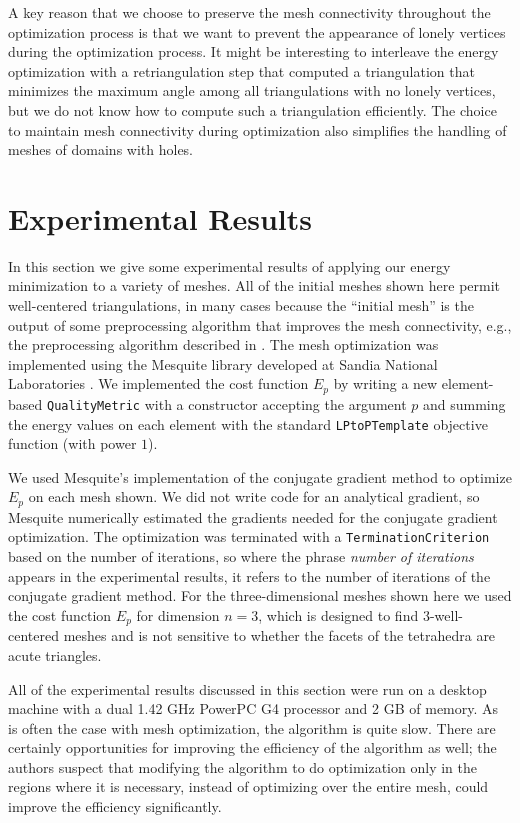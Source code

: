 \documentclass[final]{siamltex}
\begin{document}
A key reason that we choose to preserve the mesh connectivity
throughout the optimization process is that we want to
prevent the appearance of lonely vertices
during the optimization process.  It might
be interesting to interleave the energy optimization with a
retriangulation step that computed a triangulation that minimizes the
maximum angle among all triangulations with no lonely vertices, but we
do not know how to compute such a triangulation efficiently.  The
choice to maintain mesh connectivity during optimization also
simplifies the handling of meshes of domains with holes.



\section{Experimental Results}
\label{sec:results}

In this section we give some experimental results of applying our
energy minimization to a variety of meshes.  All of the initial meshes
shown here permit well-centered triangulations,
in many cases because the ``initial mesh'' is the output
of some preprocessing algorithm that improves the mesh
connectivity, e.g., the preprocessing algorithm described
in \cite{VaHiGuRa2007}.
The mesh optimization was
implemented using the Mesquite library developed at Sandia National
Laboratories \cite{BrDiKnLeMe2003}.  We implemented the cost function
$E_{p}$ by writing a new element-based {\texttt{QualityMetric}} with a
constructor accepting the argument $p$ and summing the energy values
on each element with the standard {\texttt{LPtoPTemplate}} objective
function (with power $1$).

We used Mesquite's implementation of the conjugate gradient method to
optimize $E_{p}$ on each mesh shown.  We did not write code for an
analytical gradient, so Mesquite numerically estimated the gradients
needed for the conjugate gradient optimization.  The optimization was
terminated with a {\texttt{TerminationCriterion}} based on the number
of iterations, so where the phrase {\emph{number of iterations}}
appears in the experimental results, it refers to the number of
iterations of the conjugate gradient method.  For the
three-dimensional meshes shown here we used the cost function $E_{p}$
for dimension $n = 3$, which is designed to find $3$-well-centered
meshes and is not sensitive to whether the facets of the tetrahedra
are acute triangles.

All of the experimental results discussed in this section were run on
a desktop machine with a dual 1.42 GHz PowerPC G4 processor and 2 GB
of memory.  As is often the case with mesh optimization, the algorithm is quite
slow.  There are certainly opportunities for improving the efficiency
of the algorithm as well; the authors suspect that modifying the
algorithm to do optimization only in the regions where it is
necessary, instead of optimizing over the entire mesh, could improve
the efficiency significantly.
\end{document}
